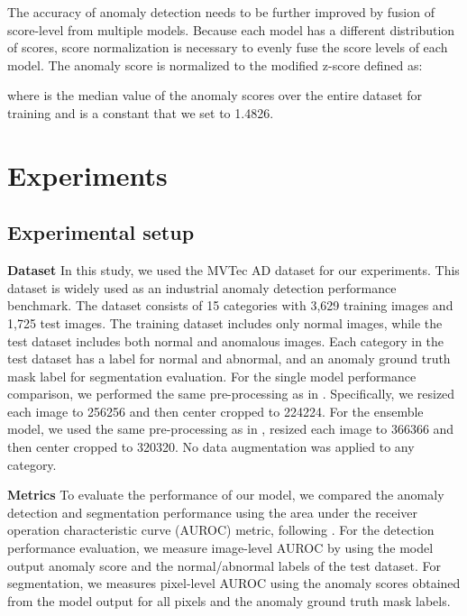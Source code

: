 \documentclass[10pt,onecolumn,letterpaper]{article}
\begin{document}
The accuracy of anomaly detection needs to be further improved by fusion of score-level from multiple models. Because each model has a different distribution of scores, score normalization is necessary to evenly fuse the score levels of each model. The anomaly score is normalized to the modified z-score \cite{agga2019zscore} defined as:

where  is the median value of the anomaly scores over the entire dataset for training and  is a constant that we set to 1.4826.


\section{Experiments}
\subsection{Experimental setup}
\textbf{Dataset}
In this study, we used the MVTec AD \cite{bergmann2019mvtec} dataset for our experiments. This dataset is widely used as an industrial anomaly detection performance benchmark. The dataset consists of 15 categories with 3,629 training images and 1,725 test images. The training dataset includes only normal images, while the test dataset includes both normal and anomalous images. Each category in the test dataset has a label for normal and abnormal, and an anomaly ground truth mask label for segmentation evaluation.
For the single model performance comparison, we performed the same pre-processing as in \cite{cohen2020sub, defard2021padim, lee2022cfa, roth2022towards}. Specifically, we resized each image to 256256 and then center cropped to 224224. For the ensemble model, we used the same pre-processing as in \cite{roth2022towards}, resized each image to 366366 and then center cropped to 320320. No data augmentation was applied to any category.

\textbf{Metrics}
To evaluate the performance of our model, we compared the anomaly detection and segmentation performance using the area under the receiver operation characteristic curve (AUROC) metric, following \cite{cohen2020sub, defard2021padim, lee2022cfa, roth2022towards}.
For the detection performance evaluation, we measure image-level AUROC by using the model output anomaly score and the normal/abnormal labels of the test dataset. For segmentation, we measures pixel-level AUROC using the anomaly scores obtained from the model output for all pixels and the anomaly ground truth mask labels.
\end{document}
